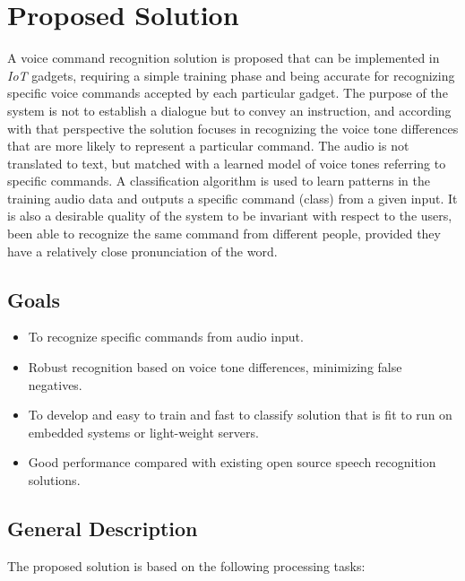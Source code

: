 \documentclass[anon]{CI}
\begin{document}
\section{Proposed Solution}

A voice command recognition solution is proposed that can be implemented in \emph{IoT} gadgets, requiring a simple training phase and being accurate for recognizing specific voice commands accepted by each particular gadget. The purpose of the system is not to establish a dialogue but to convey an instruction, and according with that perspective the solution focuses in recognizing the voice tone differences that are more likely to represent a particular command. The audio is not translated to text, but matched with a learned model of voice tones referring to specific commands. A classification algorithm is used to learn patterns in the training audio data and outputs a specific command (class) from a given input. It is also a desirable quality of the system to be invariant with respect to the users, been able to recognize the same command from different people, provided they have a relatively close pronunciation of the word.

\subsection{Goals}
\begin{itemize}
	\item To recognize specific commands from audio input.
	\item Robust recognition based on voice tone differences, minimizing false negatives.
	\item To develop and easy to train and fast to classify solution that is fit to run on embedded systems or light-weight servers.
	\item Good performance compared with existing open source speech 
recognition solutions.
\end{itemize}

\subsection{General Description}

The proposed solution is based on the following processing tasks:
\end{document}

